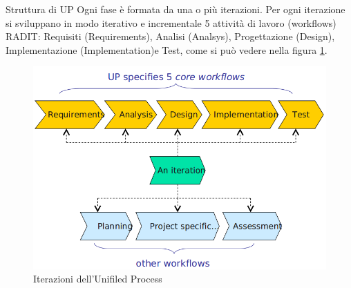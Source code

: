  \begin{frame} {Struttura di UP}
   Ogni fase è formata da una o più iterazioni. Per ogni iterazione si sviluppano in modo iterativo e incrementale 5 attività di lavoro 
   (workflows) RADIT: Requisiti (Requirements), Analisi (Analsys), Progettazione (Design), Implementazione (Implementation)e Test, come si 
   può vedere nella figura \ref{fig_UIW}.
   \begin{figure}
     \includegraphics[scale=0.20]{image/Up_Iteration_Workflows.png}{\centering}
    \caption{Iterazioni dell'Unifiled Process} 
    \label{fig_UIW}
   \end{figure}
  \end{frame}

